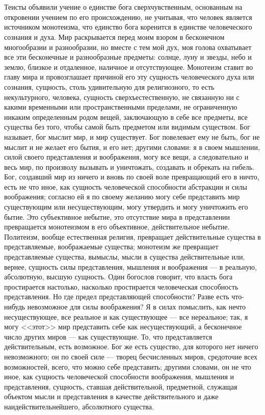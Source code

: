 \documentclass[12pt]{article}
\begin{document}
\section{}

Теисты объявили учение о единстве бога сверхчувственным, основанным на откровении учением по его происхождению, не учитывая, что человек является источником монотеизма, что единство бога коренится в единстве человеческого сознания и духа. Мир раскрывается перед моим взором в бесконечном многообразии и разнообразии, но вместе с тем мой дух, моя голова охватывает все эти бесконечные и разнообразные предметы: солнце, луну и звезды, небо и землю, близкое и отдаленное, наличное и отсутствующее. Монотеизм ставит во главу мира и провозглашает причиной его эту сущность человеческого духа или сознания, сущность, столь удивительную для религиозного, то есть некультурного, человека, сущность сверхъестественную, не связанную ни с какими временными или пространственными пределами, не ограниченную никаким определенным родом вещей, заключающую в себе все предметы, все существа без того, чтобы самой быть предметом или видимым существом. Бог называет, бог мыслит мир, и мир существует. Бог повелевает ему не быть, бог не мыслит и не желает его бытия, и его нет; другими словами: я в своем мышлении, силой своего представления и воображения, могу все вещи, а следовательно и весь мир, по произволу вызывать и уничтожать, создавать и обрекать на гибель. Бог, создавший мир из ничего и вновь по своей воле превращающий его в ничто, есть не что иное, как сущность человеческой способности абстракции и силы воображения; согласно ей я по своему желанию могу себе представить мир существующим или несуществующим, могу утвердить и могу уничтожить его бытие. Это субъективное небытие, это отсутствие мира в представлении превращается монотеизмом в его объективное, действительное небытие. Политеизм, вообще естественная религия, превращает действительные существа в представляемые, воображаемые существа; монотеизм же превращает представляемые существа, вымыслы, мысли в существа действительные или, вернее, сущность силы представления, мышления и воображения --- в реальную, абсолютную, высшую сущность. Один богослов говорит, что власть бога простирается настолько, насколько простирается человеческая способность представления. Но где предел представляющей способности? Разве есть что-нибудь невозможное для силы воображения? Я в силах помыслить, как нечто несуществующее, все реальное и как существующее --- все нереальное; так, я могу <<этот>> мир представить себе как несуществующий, а бесконечное число других миров --- как существующие. То, что представляется действительным, есть возможное. Бог же есть существо, для которого нет ничего невозможного; он по своей силе --- творец бесчисленных миров, средоточие всех возможностей, всего, что можно себе представить; другими словами, он не что иное, как сущность человеческой способности воображения, мышления и представления, сущность, ставшая действительной, предметной, служащая объектом мысли и представления в качестве действительного и даже наидействительнейшего, абсолютного существа.
\end{document}
